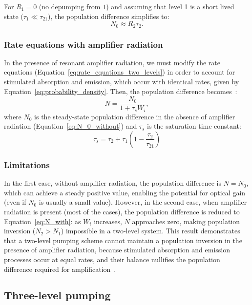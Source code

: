 \documentclass[prl,twocolumn]{revtex4-1}
\begin{document}
For $R_1 = 0$ (no depumping from $1$) and assuming that level 1 is a short lived state ($\tau_1 \ll \tau_{21}$), the population difference simplifies to:
%
\begin{equation}
N_0 \approx R_2 \tau_2.
\end{equation}  

\subsubsection{\textbf{Rate equations with amplifier radiation}}
In the presence of resonant amplifier radiation, we must modify the rate equations (Equation~\eqref{eq:rate_equations_two_levels}) in order to account for stimulated absorption and emission, which occur with identical rates, given by Equation~\eqref{eq:probability_density}. Then, the population difference becomes~\cite{Saleh2007}:
%
\begin{equation}
    \label{eq:N_with}
    N = \frac{N_0}{1 + \tau_s W_i},
\end{equation}
%
where $N_0$ is the steady-state population difference in the absence of amplifier radiation (Equation~\eqref{eq:N_0_without}) and $\tau_s$ is the saturation time constant:
%
\begin{equation}
    \label{eq:saturation_time}
    \tau_s = \tau_2+ \tau_1\left(1-\frac{\tau_2}{\tau_{21}}\right)
\end{equation} 

\subsubsection{\textbf{Limitations}}
In the first case, without amplifier radiation, the population difference is $N = N_0$, which can achieve a steady positive value, enabling the potential for optical gain (even if $N_0$ is usually a small value). However, in the second case, when amplifier radiation is present (most of the cases), the population difference is reduced to Equation~\eqref{eq:N_with}: as $W_i$ increases, $N$ approaches zero, making population inversion ($N_2 > N_1$) impossible in a two-level system. This result demonstrates that a two-level pumping scheme cannot maintain a population inversion in the presence of amplifier radiation, because stimulated absorption and emission processes occur at equal rates, and their balance nullifies the population difference required for amplification~\cite{Saleh2007}. 

\subsection{Three-level pumping}
\end{document}
